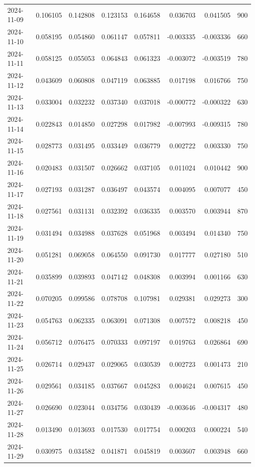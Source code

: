 \begin{tabular}{lrrrrrrr}
2024-11-09 & 0.106105 & 0.142808 & 0.123153 & 0.164658 & 0.036703 & 0.041505 & 900 \\
2024-11-10 & 0.058195 & 0.054860 & 0.061147 & 0.057811 & -0.003335 & -0.003336 & 660 \\
2024-11-11 & 0.058125 & 0.055053 & 0.064843 & 0.061323 & -0.003072 & -0.003519 & 780 \\
2024-11-12 & 0.043609 & 0.060808 & 0.047119 & 0.063885 & 0.017198 & 0.016766 & 750 \\
2024-11-13 & 0.033004 & 0.032232 & 0.037340 & 0.037018 & -0.000772 & -0.000322 & 630 \\
2024-11-14 & 0.022843 & 0.014850 & 0.027298 & 0.017982 & -0.007993 & -0.009315 & 780 \\
2024-11-15 & 0.028773 & 0.031495 & 0.033449 & 0.036779 & 0.002722 & 0.003330 & 750 \\
2024-11-16 & 0.020483 & 0.031507 & 0.026662 & 0.037105 & 0.011024 & 0.010442 & 900 \\
2024-11-17 & 0.027193 & 0.031287 & 0.036497 & 0.043574 & 0.004095 & 0.007077 & 450 \\
2024-11-18 & 0.027561 & 0.031131 & 0.032392 & 0.036335 & 0.003570 & 0.003944 & 870 \\
2024-11-19 & 0.031494 & 0.034988 & 0.037628 & 0.051968 & 0.003494 & 0.014340 & 750 \\
2024-11-20 & 0.051281 & 0.069058 & 0.064550 & 0.091730 & 0.017777 & 0.027180 & 510 \\
2024-11-21 & 0.035899 & 0.039893 & 0.047142 & 0.048308 & 0.003994 & 0.001166 & 630 \\
2024-11-22 & 0.070205 & 0.099586 & 0.078708 & 0.107981 & 0.029381 & 0.029273 & 300 \\
2024-11-23 & 0.054763 & 0.062335 & 0.063091 & 0.071308 & 0.007572 & 0.008218 & 450 \\
2024-11-24 & 0.056712 & 0.076475 & 0.070333 & 0.097197 & 0.019763 & 0.026864 & 690 \\
2024-11-25 & 0.026714 & 0.029437 & 0.029065 & 0.030539 & 0.002723 & 0.001473 & 210 \\
2024-11-26 & 0.029561 & 0.034185 & 0.037667 & 0.045283 & 0.004624 & 0.007615 & 450 \\
2024-11-27 & 0.026690 & 0.023044 & 0.034756 & 0.030439 & -0.003646 & -0.004317 & 480 \\
2024-11-28 & 0.013490 & 0.013693 & 0.017530 & 0.017754 & 0.000203 & 0.000224 & 540 \\
2024-11-29 & 0.030975 & 0.034582 & 0.041871 & 0.045819 & 0.003607 & 0.003948 & 660 \\

\end{tabular}

